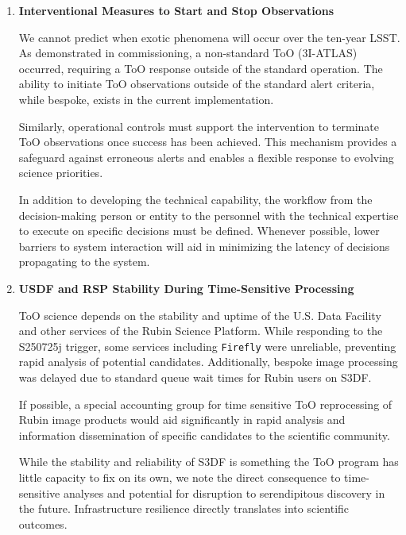 \begin{enumerate}
Potential success criteria could be as simple as detection in a single band, or as complex as coverage of 24 magnitude or greater in r band over the entire 90\% localization region within eighteen hours of alert receipt.

These success definitions, specific to each ToO target class and informed by the science community, will guide LSST operations through data-driven revision of observing strategies and criteria-driven decisions on observing plans.

\item \textbf{Interventional Measures to Start and Stop Observations}

We cannot predict when exotic phenomena will occur over the ten-year LSST. As demonstrated in commissioning, a non-standard ToO (3I-ATLAS) occurred, requiring a ToO response outside of the standard operation. The ability to initiate ToO observations outside of the standard alert criteria, while bespoke, exists in the current implementation.

Similarly, operational controls must support the intervention to terminate ToO observations once success has been achieved. This mechanism provides a safeguard against erroneous alerts and enables a flexible response to evolving science priorities.

In addition to developing the technical capability, the workflow from the decision-making person or entity to the personnel with the technical expertise to execute on specific decisions must be defined. Whenever possible, lower barriers to system interaction will aid in minimizing the latency of decisions propagating to the system.

\item \textbf{USDF and RSP Stability During Time-Sensitive Processing}

ToO science depends on the stability and uptime of the U.S. Data Facility and other services of the Rubin Science Platform. While responding to the S250725j trigger, some services including \texttt{Firefly} were unreliable, preventing rapid analysis of potential candidates. Additionally, bespoke image processing was delayed due to standard queue wait times for Rubin users on S3DF.

If possible, a special accounting group for time sensitive ToO reprocessing of Rubin image products would aid significantly in rapid analysis and information dissemination of specific candidates to the scientific community.

While the stability and reliability of S3DF is something the ToO program has little capacity to fix on its own, we note the direct consequence to time-sensitive analyses and potential for disruption to serendipitous discovery in the future. Infrastructure resilience directly translates into scientific outcomes.


\end{enumerate}
